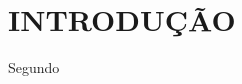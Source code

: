 
\chapter{INTRODUÇÃO}
\label{chap:introducao}

\lipsum[1-2]\cite{Iezzi_fund1}

\lipsum[3-4]\cite{Leggieri2018a, Muller2019}

\begin{citacao}
	 Segundo \cite{AnaF} \lipsum[5-5] 
\end{citacao}

